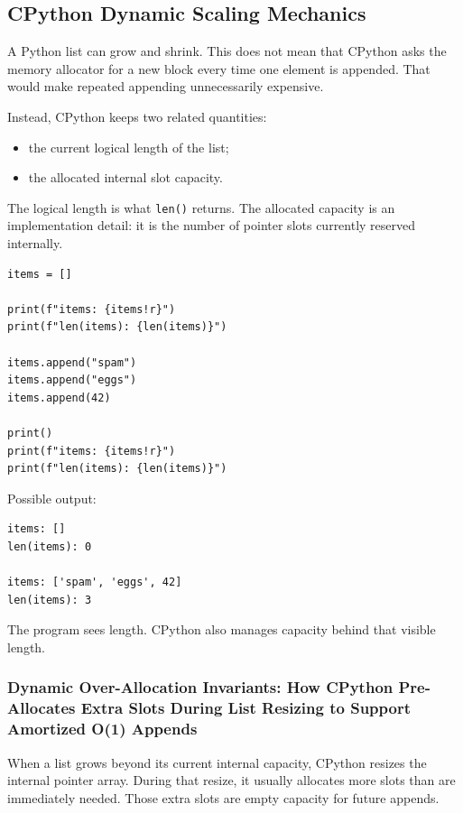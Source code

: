\subsection{CPython Dynamic Scaling Mechanics}

A Python list can grow and shrink. This does not mean that CPython asks the memory allocator for a new block every time one element is appended. That would make repeated appending unnecessarily expensive.

Instead, CPython keeps two related quantities:

\begin{itemize}
    \item the current logical length of the list;
    \item the allocated internal slot capacity.
\end{itemize}

The logical length is what \texttt{len()} returns. The allocated capacity is an implementation detail: it is the number of pointer slots currently reserved internally.

\begin{verbatim}
items = []

print(f"items: {items!r}")
print(f"len(items): {len(items)}")

items.append("spam")
items.append("eggs")
items.append(42)

print()
print(f"items: {items!r}")
print(f"len(items): {len(items)}")
\end{verbatim}

Possible output:

\begin{verbatim}
items: []
len(items): 0

items: ['spam', 'eggs', 42]
len(items): 3
\end{verbatim}

The program sees length. CPython also manages capacity behind that visible length.

\subsubsection{Dynamic Over-Allocation Invariants: How CPython Pre-Allocates Extra Slots During List Resizing to Support Amortized O(1) Appends}

When a list grows beyond its current internal capacity, CPython resizes the internal pointer array. During that resize, it usually allocates more slots than are immediately needed. Those extra slots are empty capacity for future appends.

